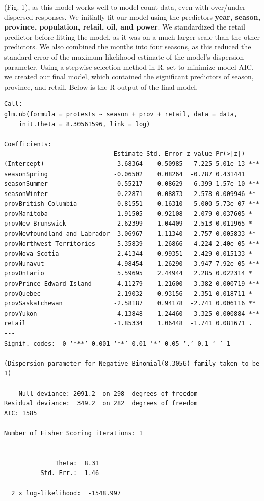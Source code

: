\documentclass[12pt]{article}
\begin{document}
(Fig. 1), as this model works well to model count data, even with over/under-dispersed responses. We initially fit our model using the predictors \textbf{year, season, province, population, retail, oil, and power}. We standardized the retail predictor before fitting the model, as it was on a much larger scale than the other predictors. We also combined the months into four seasons, as this reduced the standard error of the maximum likelihood estimate of the model's dispersion parameter. Using a stepwise selection method in R, set to minimize model AIC, we created our final model, which contained the significant predictors of season, province, and retail. Below is the R output of the final model.
\begin{verbatim}
Call:
glm.nb(formula = protests ~ season + prov + retail, data = data, 
    init.theta = 8.30561596, link = log)

Coefficients:
                              Estimate Std. Error z value Pr(>|z|)    
(Intercept)                    3.68364    0.50985   7.225 5.01e-13 ***
seasonSpring                  -0.06502    0.08264  -0.787 0.431441    
seasonSummer                  -0.55217    0.08629  -6.399 1.57e-10 ***
seasonWinter                  -0.22871    0.08873  -2.578 0.009946 ** 
provBritish Columbia           0.81551    0.16310   5.000 5.73e-07 ***
provManitoba                  -1.91505    0.92108  -2.079 0.037605 *  
provNew Brunswick             -2.62399    1.04409  -2.513 0.011965 *  
provNewfoundland and Labrador -3.06967    1.11340  -2.757 0.005833 ** 
provNorthwest Territories     -5.35839    1.26866  -4.224 2.40e-05 ***
provNova Scotia               -2.41344    0.99351  -2.429 0.015133 *  
provNunavut                   -4.98454    1.26290  -3.947 7.92e-05 ***
provOntario                    5.59695    2.44944   2.285 0.022314 *  
provPrince Edward Island      -4.11279    1.21600  -3.382 0.000719 ***
provQuebec                     2.19032    0.93156   2.351 0.018711 *  
provSaskatchewan              -2.58187    0.94178  -2.741 0.006116 ** 
provYukon                     -4.13848    1.24460  -3.325 0.000884 ***
retail                        -1.85334    1.06448  -1.741 0.081671 .  
---
Signif. codes:  0 ‘***’ 0.001 ‘**’ 0.01 ‘*’ 0.05 ‘.’ 0.1 ‘ ’ 1

(Dispersion parameter for Negative Binomial(8.3056) family taken to be 1)

    Null deviance: 2091.2  on 298  degrees of freedom
Residual deviance:  349.2  on 282  degrees of freedom
AIC: 1585

Number of Fisher Scoring iterations: 1


              Theta:  8.31 
          Std. Err.:  1.46 

  2 x log-likelihood:  -1548.997 
\end{verbatim}
\end{document}

